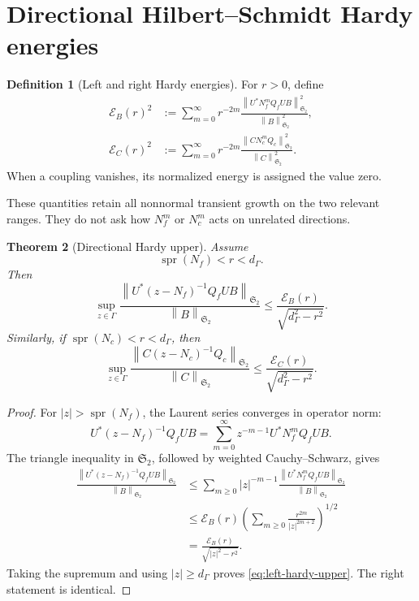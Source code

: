 \documentclass[11pt]{article}
\newtheorem{theorem}{Theorem}[section]
\theoremstyle{definition}
\newtheorem{definition}[theorem]{Definition}
\theoremstyle{remark}
\newcommand{\cE}{\mathcal E}
\newcommand{\HS}{\mathfrak S_2}
\newcommand{\spr}{\operatorname{spr}}
\newcommand{\norm}[1]{\left\lVert #1\right\rVert}
\begin{document}
\section{Directional Hilbert--Schmidt Hardy energies}
\label{sec:hardy}

\begin{definition}[Left and right Hardy energies]
\label{def:energies}
For \(r>0\), define
\begin{align}
 \cE_B(r)^2
 &:=
 \sum_{m=0}^{\infty}r^{-2m}
 \frac{
 \norm{U^*N_f^mQ_fUB}_{\HS}^2
 }{\norm B_{\HS}^2},
 \label{eq:left-energy}\\
 \cE_C(r)^2
 &:=
 \sum_{m=0}^{\infty}r^{-2m}
 \frac{
 \norm{CN_c^mQ_c}_{\HS}^2
 }{\norm C_{\HS}^2}.
 \label{eq:right-energy}
\end{align}
When a coupling vanishes, its normalized energy is assigned the value zero.
\end{definition}

These quantities retain all nonnormal transient growth on the two relevant
ranges.  They do not ask how \(N_f^m\) or \(N_c^m\) acts on unrelated
directions.

\begin{theorem}[Directional Hardy upper]
\label{thm:hardy-upper}
Assume
\begin{equation}
 \spr(N_f)<r<d_\Gamma.
 \label{eq:hardy-window}
\end{equation}
Then
\begin{equation}
 \boxed{
 \sup_{z\in\Gamma}
 \frac{
 \norm{U^*(z-N_f)^{-1}Q_fUB}_{\HS}
 }{\norm B_{\HS}}
 \le
 \frac{\cE_B(r)}{\sqrt{d_\Gamma^2-r^2}}.}
 \label{eq:left-hardy-upper}
\end{equation}
Similarly, if \(\spr(N_c)<r<d_\Gamma\), then
\begin{equation}
 \boxed{
 \sup_{z\in\Gamma}
 \frac{
 \norm{C(z-N_c)^{-1}Q_c}_{\HS}
 }{\norm C_{\HS}}
 \le
 \frac{\cE_C(r)}{\sqrt{d_\Gamma^2-r^2}}.}
 \label{eq:right-hardy-upper}
\end{equation}
\end{theorem}

\begin{proof}
For \(|z|>\spr(N_f)\), the Laurent series converges in operator norm:
\[
 U^*(z-N_f)^{-1}Q_fUB
 =
 \sum_{m=0}^{\infty}z^{-m-1}
 U^*N_f^mQ_fUB.
\]
The triangle inequality in \(\HS\), followed by weighted
Cauchy--Schwarz, gives
\begin{align*}
 \frac{\norm{U^*(z-N_f)^{-1}Q_fUB}_{\HS}}{\norm B_{\HS}}
 &\le
 \sum_{m\ge0}|z|^{-m-1}
 \frac{\norm{U^*N_f^mQ_fUB}_{\HS}}{\norm B_{\HS}}\\
 &\le
 \cE_B(r)
 \left(
 \sum_{m\ge0}\frac{r^{2m}}{|z|^{2m+2}}
 \right)^{1/2}\\
 &=
 \frac{\cE_B(r)}{\sqrt{|z|^2-r^2}}.
\end{align*}
Taking the supremum and using \(|z|\ge d_\Gamma\) proves
\eqref{eq:left-hardy-upper}.  The right statement is identical.
\end{proof}
\end{document}
